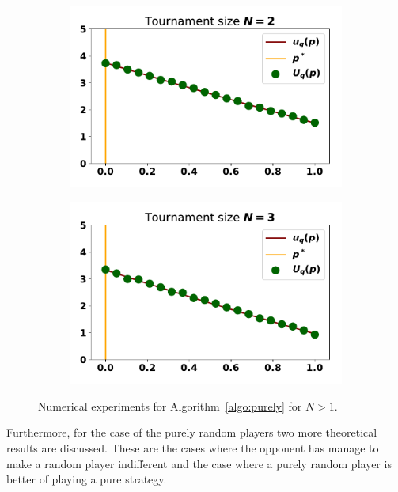 \documentclass[10pt]{article}
\begin{document}
\begin{figure}
    \centering
    \begin{subfigure}{0.45\textwidth}
        \centering
        \includegraphics[width=.95\textwidth]{img/purely_random_tournament_one.pdf}
    \end{subfigure}
    \begin{subfigure}{0.45\textwidth}
        \centering
        \includegraphics[width=.95\textwidth]{img/purely_random_tournament_two.pdf}
    \end{subfigure}
    \caption{Numerical experiments for Algorithm~\ref{algo:purely} for \(N>1\).}
    \label{fig:purely_random_tournament_results}
\end{figure}

Furthermore, for the case of the purely random players two more theoretical results
are discussed. These are the cases where the opponent has manage to make a random
player indifferent and the case where a purely random player is better of playing
a pure strategy.
\end{document}
